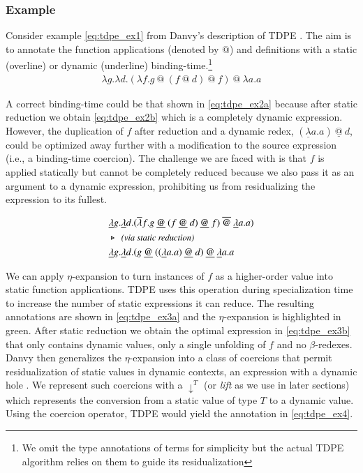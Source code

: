 \documentclass[a4paper,12pt,twoside,openright]{report}
\theoremstyle{definition}
\begin{document}

\subsubsection{Example}\label{subsec:tdpe_ex}
Consider example \eqref{eq:tdpe_ex1} from Danvy's description of TDPE \cite{danvy1999type}. The aim is to annotate the function applications (denoted by $@$) and definitions with a static (overline) or dynamic (underline) binding-time.\footnote{We omit the type annotations of terms for simplicity but the actual TDPE algorithm relies on them to guide its residualization}
\begin{align}
    \lambda g.\lambda d.(\lambda f.g \:@ \: (f \: @ \: d)\: @ \:f) \: @ \: \lambda a.a \label{eq:tdpe_ex1}
\end{align}

A correct binding-time could be that shown in \eqref{eq:tdpe_ex2a} because after static reduction we obtain \eqref{eq:tdpe_ex2b} which is a completely dynamic expression. However, the duplication of $f$ after reduction and a dynamic redex, $(\underline{\lambda}a.a) \: \underline{@} \: d$, could be optimized away further with a modification to the source expression (i.e., a binding-time coercion). The challenge we are faced with is that $f$ is applied statically but cannot be completely reduced because we also pass it as an argument to a dynamic expression, prohibiting us from residualizing the expression to its fullest.
\begin{figure}[htp!]
    \begin{align}
        & \underline{\lambda}g.\underline{\lambda} d.(\overline{\lambda} f.g \: \underline{@} \: (f \: \underline{@} \: d) \: \underline{@} \: f) \: \overline{@} \: \underline{\lambda} a.a) \label{eq:tdpe_ex2a} \\
        & \triangleright \:\: \emph{\small{\text{(via static reduction)}}} \nonumber \\
        & \underline{\lambda}g.\underline{\lambda} d.(g \: \underline{@} \: ((\underline{\lambda} a.a) \: \underline{@} \: d) \: \underline{@} \: \underline{\lambda} a.a \label{eq:tdpe_ex2b}
    \end{align}
\end{figure}

We can apply $\eta$-expansion to turn instances of $f$ as a higher-order value into static function applications. TDPE uses this operation during specialization time to increase the number of static expressions it can reduce. The resulting annotations are shown in \eqref{eq:tdpe_ex3a} and the $\eta$-expansion is highlighted in green. After static reduction we obtain the optimal expression in \eqref{eq:tdpe_ex3b} that only contains dynamic values, only a single unfolding of $f$ and no $\beta$-redexes. Danvy then generalizes the $\eta$-expansion into a class of coercions that permit residualization of static values in dynamic contexts, an expression with a dynamic hole \cite{danvy1995essence}. We represent such coercions with a $\downarrow^T$ (or \textit{lift} as we use in later sections) which represents the conversion from a static value of type $T$ to a dynamic value. Using the coercion operator, TDPE would yield the annotation in \eqref{eq:tdpe_ex4}.
\end{document}
